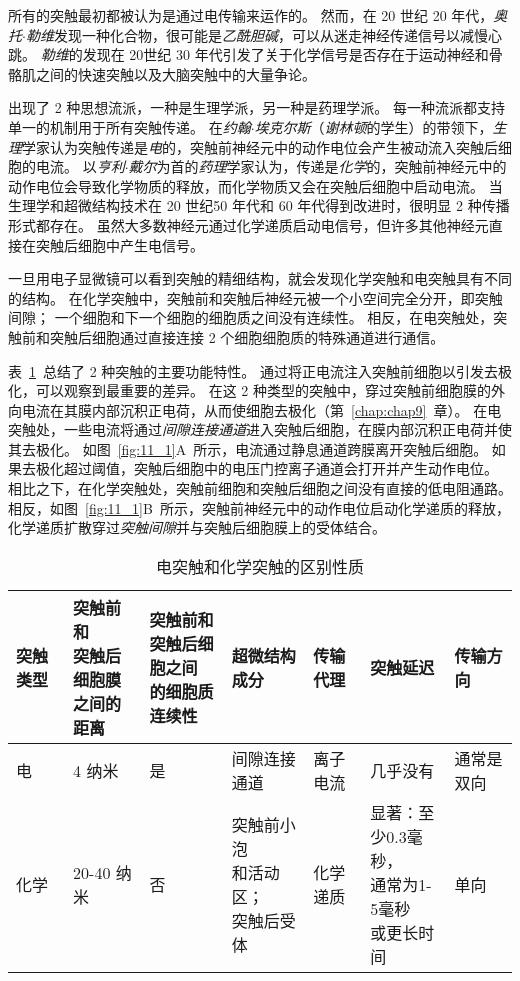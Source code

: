 所有的突触最初都被认为是通过电传输来运作的。
然而，在 20 世纪 20  年代，\textit{奥托$\cdot$勒维}发现一种化合物，很可能是\textit{乙酰胆碱}，可以从迷走神经传递信号以减慢心跳。
\textit{勒维}的发现在 20世纪 30 年代引发了关于化学信号是否存在于运动神经和骨骼肌之间的快速突触以及大脑突触中的大量争论。


出现了 2 种思想流派，一种是生理学派，另一种是药理学派。
每一种流派都支持单一的机制用于所有突触传递。
在\textit{约翰$\cdot$埃克尔斯}（\textit{谢林顿}的学生）的带领下，\textit{生理}学家认为突触传递是\textit{电}的，突触前神经元中的动作电位会产生被动流入突触后细胞的电流。
以\textit{亨利$\cdot$戴尔}为首的\textit{药理}学家认为，传递是\textit{化学}的，突触前神经元中的动作电位会导致化学物质的释放，而化学物质又会在突触后细胞中启动电流。
当生理学和超微结构技术在 20 世纪50 年代和 60 年代得到改进时，很明显 2 种传播形式都存在。
虽然大多数神经元通过化学递质启动电信号，但许多其他神经元直接在突触后细胞中产生电信号。


一旦用电子显微镜可以看到突触的精细结构，就会发现化学突触和电突触具有不同的结构。
在化学突触中，突触前和突触后神经元被一个小空间完全分开，即突触间隙；
一个细胞和下一个细胞的细胞质之间没有连续性。
相反，在电突触处，突触前和突触后细胞通过直接连接 2 个细胞细胞质的特殊通道进行通信。


表~\ref{tab:11_1}~总结了 2 种突触的主要功能特性。
通过将正电流注入突触前细胞以引发去极化，可以观察到最重要的差异。
在这 2 种类型的突触中，穿过突触前细胞膜的外向电流在其膜内部沉积正电荷，从而使细胞去极化（第~\ref{chap:chap9}~章）。
在电突触处，一些电流将通过\textit{间隙连接通道}进入突触后细胞，在膜内部沉积正电荷并使其去极化。
如图~\ref{fig:11_1}A~所示，电流通过静息通道跨膜离开突触后细胞。
如果去极化超过阈值，突触后细胞中的电压门控离子通道会打开并产生动作电位。
相比之下，在化学突触处，突触前细胞和突触后细胞之间没有直接的低电阻通路。
相反，如图~\ref{fig:11_1}B~所示，突触前神经元中的动作电位启动化学递质的释放，化学递质扩散穿过\textit{突触间隙}并与突触后细胞膜上的受体结合。


\begin{table}[htbp]
	\caption{电突触和化学突触的区别性质} \label{tab:11_1} \centering
	\begin{tabular}{lllllll}
		\toprule
		突触类型 & \makecell{突触前和\\突触后细胞膜\\之间的距离} & \makecell{突触前和\\突触后细胞之间\\的细胞质连续性} & 超微结构成分 & 传输代理 & 突触延迟 & 传输方向 \\
		\midrule
		电 & 4 纳米 & 是 & 间隙连接通道 & 离子电流 & 几乎没有 & 通常是双向 \\
		化学 & 20-40 纳米 & 否 & \makecell[l]{突触前小泡\\和活动区；\\突触后受体} & 化学递质 & \makecell[l]{显著：至\\少0.3毫秒，\\通常为1-5毫秒\\或更长时间} & 单向 \\
		\bottomrule
	\end{tabular}
\end{table}


